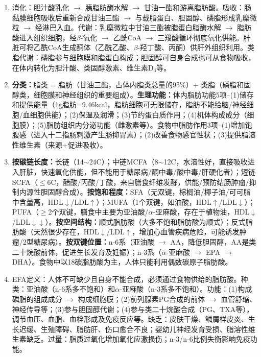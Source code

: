 {\begin{enumerate}[leftmargin=*, itemsep=5pt]
    \item 消化：胆汁酸乳化 $\rightarrow$ 胰脂肪酶水解 $\rightarrow$ 甘油一酯和游离脂肪酸。吸收：肠黏膜细胞吸收后重新合成甘油三酯 $\rightarrow$ 与载脂蛋白、胆固醇、磷脂形成乳糜微粒 $\rightarrow$ 经淋巴入血。代谢：乳糜微粒中甘油三酯被脂蛋白脂酶水解 $\rightarrow$ 脂肪酸进入组织细胞，经$\beta$-氧化 $\rightarrow$ 乙酰CoA $\rightarrow$ 三羧酸循环彻底氧化供能。肝脏可将乙酰CoA生成酮体（乙酰乙酸、$\beta$-羟丁酸、丙酮）供肝外组织利用。类脂代谢：磷脂参与细胞膜和脂蛋白构成；胆固醇可自身合成也可从食物吸收，在体内转化为胆汁酸、类固醇激素、维生素D$_3$等。

    \item \textbf{分类：}脂类 = 脂肪（甘油三酯，占体内脂类总量的95\%）+ 类脂（磷脂和固醇类，细胞膜和神经组织的重要组成）。\textbf{生理功能：}体内脂肪功能5项--(1)储存和提供能量（1g脂肪=9.46kcal，脂肪细胞可无限储存，脂肪不能给脑/神经细胞/血细胞供能）；(2)保温及润滑；(3)节约蛋白质作用；(4)机体构成成分（细胞膜）；(5)脂肪组织内分泌功能（雌激素等）。食物中脂肪作用3项--(1)增加饱腹感（进入十二指肠刺激产生肠抑胃素）；(2)改善食物感官性状；(3)提供脂溶性维生素（来源+促进吸收）。

    \item \textbf{按碳链长度：}长链（14$\sim$24C）；中链MCFA（8$\sim$12C，水溶性好，直接吸收进入肝脏，快速氧化供能，但不能用于糖尿病/酮中毒/酸中毒/肝硬化者）；短链SCFA（$\leq$6C，醋酸/丙酸/丁酸，来自膳食纤维发酵，供能/预防结肠肿瘤/抑制内源性胆固醇合成）。\textbf{按饱和程度：}SFA（无双键，棕榈油/椰子油/可可脂中含量高，HDL$\downarrow$/LDL$\uparrow$）；MUFA（1个双键，如油酸，HDL$\uparrow$/LDL$\downarrow$）；PUFA（$\geq$2个双键，膳食中主要为亚油酸/$\alpha$-亚麻酸，存在于植物油，HDL$\downarrow$/LDL$\downarrow\downarrow$）。\textbf{按空间结构：}顺式脂肪酸（大多不饱和脂肪酸为顺式）；反式脂肪酸（天然很少存在，HDL$\downarrow$/LDL$\uparrow$，增加心血管疾病危险，可能诱发肿瘤/2型糖尿病）。\textbf{按双键位置：}n-6系（亚油酸 $\rightarrow$ AA，降低胆固醇，AA是类二十烷酸前体，促进生长发育及妊娠）；n-3系（$\alpha$-亚麻酸 $\rightarrow$ EPA $\rightarrow$ DHA）。食物中以18碳脂肪酸为主，人体只能利用偶数碳原子脂肪酸。

    \item EFA定义：人体不可缺少且自身不能合成，必须通过食物供给的脂肪酸。种类：亚油酸（n-6系多不饱和）和$\alpha$-亚麻酸（n-3系多不饱和）。功能：(1)构成磷脂的组成成分 $\rightarrow$ 构成细胞膜；(2)前列腺素PG合成的前体 $\rightarrow$ 血管舒缩、神经传导等；(3)参与胆固醇代谢；(4)参与类二十烷酸合成（PG、TXA等），调节血压、血脂、血栓形成及免疫反应等。缺乏：皮肤干燥、鳞屑样皮炎、生长迟缓、生殖障碍、脂肪肝、伤口愈合不良；婴幼儿神经发育受损、脂溶性维生素缺乏。过量：脂质过氧化增加氧化应激损伤；n-3/n-6比例失衡影响免疫功能。


\end{enumerate}}
